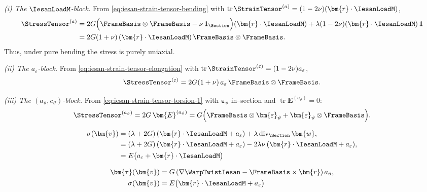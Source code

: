 \begin{Quote}

\medskip
\noindent\emph{(i) The \(\IesanLoadM\)-block.}
From \eqref{eq:iesan-strain-tensor-bending} with \(\operatorname{tr}\StrainTensor^{(a)}=(1-2\nu)(\bm{r}\cdot\IesanLoadM)\),
\[
\begin{aligned}
\StressTensor^{(a)}
&=2G\Big(\FrameBasis\otimes\FrameBasis-\nu\,\mathbf{1}_\Section\Big)(\bm{r}\cdot\IesanLoadM)
+\lambda(1-2\nu)(\bm{r}\cdot\IesanLoadM)\,\mathbf{1}\\
&=2G(1+\nu)\,(\bm{r}\cdot\IesanLoadM)\,\FrameBasis\otimes\FrameBasis.
\end{aligned}
\]
Thus, under pure bending the stress is purely uniaxial.

\medskip
\noindent\emph{(ii) The \(a_\varepsilon\)-block.}
From \eqref{eq:iesan-strain-tensor-elongation} with \(\operatorname{tr}\StrainTensor^{(\varepsilon)}=(1-2\nu)a_\varepsilon\),
\[
\StressTensor^{(\varepsilon)}
=2G(1+\nu)\,a_\varepsilon\,\FrameBasis\otimes\FrameBasis.
\]

\medskip
\noindent\emph{(iii) The \((a_\vartheta,c_\vartheta)\)-block.}
From \eqref{eq:iesan-strain-tensor-torsion-1} 
with \(\bm{\varepsilon}_{\vartheta}\) in–section and \(\operatorname{tr}\bm{E}^{(a_\vartheta)}=0\):
\[
\StressTensor^{(a_\vartheta)}
=2G\,\bm{E}^{(a_\vartheta)}
=G\Big(\FrameBasis\otimes\bm{\varepsilon}_{\vartheta}+\bm{\varepsilon}_{\vartheta}\otimes\FrameBasis\Big).
\]
\end{Quote}

\begin{Quote}
\begin{equation*}
\begin{aligned}
\sigma (\bm{v})&=(\lambda+2 G)\left(\bm{r}\cdot\IesanLoadM +a_{\varepsilon}\right) + \lambda \operatorname{div}_{\Section}\bm{w},\\
&=(\lambda+2 G)\left(\bm{r}\cdot\IesanLoadM +a_{\varepsilon}\right) - 2\lambda \nu\, (\bm{r}\cdot\IesanLoadM + a_{\varepsilon}),\\
&=E\big(a_{\varepsilon} + \bm{r}\cdot\IesanLoadM\big)
\end{aligned}
\end{equation*}
\end{Quote}
\begin{equation}
\begin{aligned}
\bm{\tau}(\bm{v})&=G\left(\nabla \WarpTwistIesan- \FrameBasis\times\bm{r}\right)a_{\vartheta}, \\ 
\sigma (\bm{v})
&=E\big(\bm{r}\cdot\IesanLoadM +a_{\varepsilon}\big)
\end{aligned}
\label{eq:iesan-stress-1}
\end{equation}

